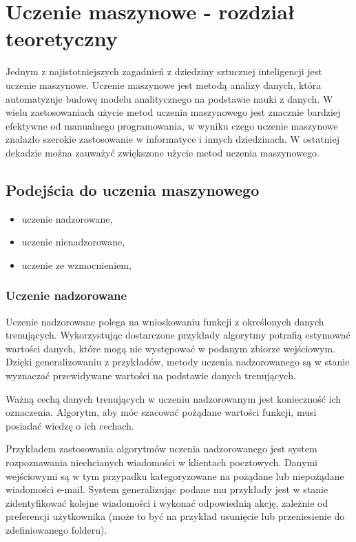 \chapter{Uczenie maszynowe - rozdział teoretyczny}
\label{cha:ogolnyrozdzialteoretyczny}

Jednym z najistotniejszych zagadnień z dziedziny sztucznej inteligencji jest uczenie maszynowe. 
Uczenie maszynowe jest metodą analizy danych, która automatyzuje budowę modelu analitycznego na podstawie nauki z 
danych. W wielu zastosowaniach użycie metod uczenia maszynowego jest znacznie bardziej efektywne od manualnego 
programowania, w wyniku czego 
uczenie maszynowe znalazło szerokie zastosowanie w informatyce i innych dziedzinach.
W ostatniej dekadzie można zauważyć zwiększone użycie metod uczenia maszynowego\cite{domingos2012few}.

\section{Podejścia do uczenia maszynowego}
\label{sec:podejsciadouczeniamaszynowego}

\begin{itemize}
 \item uczenie nadzorowane,
 \item uczenie nienadzorowane,
 \item uczenie ze wzmocnieniem,
\end{itemize}

\subsection{Uczenie nadzorowane}
\label{subsec:uczenienadzorowane}

Uczenie nadzorowane polega na wnioskowaniu funkcji z określonych danych trenujących.
Wykorzystując dostarczone przykłady algorytmy potrafią estymować wartości danych, które mogą nie występować w 
podanym zbiorze wejściowym. Dzięki generalizowaniu z przykładów, metody uczenia nadzorowanego są w stanie 
wyznaczać przewidywane wartości na podstawie danych trenujących.

Ważną cechą danych trenujących w uczeniu nadzorowanym jest konieczność ich oznaczenia. Algorytm, aby móc 
szacować pożądane wartości funkcji, musi posiadać wiedzę o ich cechach.

Przykładem zastosowania algorytmów uczenia nadzorowanego jest system rozpoznawania niechcianych wiadomości w klientach 
pocztowych. Danymi wejściowymi są w tym przypadku kategoryzowane na pożądane lub niepożądane wiadomości e-mail.
System generalizując podane mu przykłady jest w stanie zidentyfikować kolejne wiadomości i wykonać odpowiednią akcję, 
zależnie od preferencji użytkownika (może to być na przykład usunięcie lub przeniesienie do zdefiniowanego folderu).

